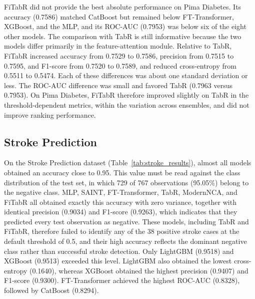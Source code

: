 \documentclass[11pt,a4paper,oneside, openany, reqno, chapter, nokorean]{oblivoir}
\theoremstyle{definition}
\theoremstyle{remark}
\numberwithin{equation}{chapter}
\theoremstyle{definition}
\theoremstyle{remark}
\theoremstyle{definition}
\begin{document}
FiTabR did not provide the best absolute performance on Pima Diabetes. Its
accuracy (0.7586) matched CatBoost but remained below FT-Transformer, XGBoost,
and the MLP, and its ROC-AUC (0.7953) was below six of the eight other models.
The comparison with TabR is still informative because the two models differ
primarily in the feature-attention module. Relative to TabR, FiTabR increased
accuracy from 0.7529 to 0.7586, precision from 0.7515 to 0.7595, and F1-score
from 0.7520 to 0.7589, and reduced cross-entropy from 0.5511 to 0.5474. Each of
these differences was about one standard deviation or less. The ROC-AUC
difference was small and favored TabR (0.7963 versus 0.7953). On Pima Diabetes,
FiTabR therefore improved slightly on TabR in the threshold-dependent metrics,
within the variation across ensembles, and did not improve ranking performance.

\subsection{Stroke Prediction}
\label{subsec:stroke_results}

On the Stroke Prediction dataset (Table~\ref{tab:stroke_results}), almost all
models obtained an accuracy close to 0.95. This value must be read against the
class distribution of the test set, in which 729 of 767 observations
(95.05\%) belong to the negative class. MLP, SAINT, FT-Transformer, TabR,
ModernNCA, and FiTabR all obtained exactly this accuracy with zero variance,
together with identical precision (0.9034) and F1-score (0.9263), which
indicates that they predicted every test observation as negative. These models,
including TabR and FiTabR, therefore failed to identify any of the 38 positive
stroke cases at the default threshold of 0.5, and their high accuracy reflects
the dominant negative class rather than successful stroke detection. Only
LightGBM (0.9518) and XGBoost (0.9513) exceeded this level. LightGBM also
obtained the lowest cross-entropy (0.1640), whereas XGBoost obtained the
highest precision (0.9407) and F1-score (0.9300). FT-Transformer achieved the
highest ROC-AUC (0.8328), followed by CatBoost (0.8294).
\end{document}

